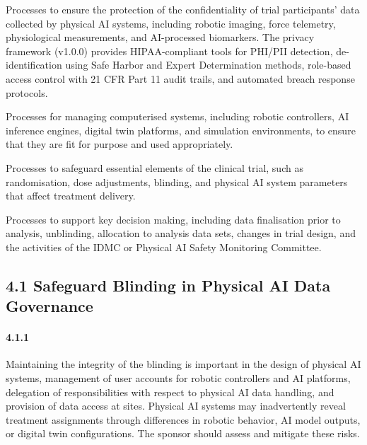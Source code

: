 \begin{description}[leftmargin=2.5cm,style=sameline]

\item[(a)] Processes to ensure the protection of the confidentiality of trial participants' data collected by physical AI systems, including robotic imaging, force telemetry, physiological measurements, and AI-processed biomarkers. The privacy framework (v1.0.0) provides HIPAA-compliant tools for PHI/PII detection, de-identification using Safe Harbor and Expert Determination methods, role-based access control with 21 CFR Part 11 audit trails, and automated breach response protocols.

\item[(b)] Processes for managing computerised systems, including robotic controllers, AI inference engines, digital twin platforms, and simulation environments, to ensure that they are fit for purpose and used appropriately.

\item[(c)] Processes to safeguard essential elements of the clinical trial, such as randomisation, dose adjustments, blinding, and physical AI system parameters that affect treatment delivery.

\item[(d)] Processes to support key decision making, including data finalisation prior to analysis, unblinding, allocation to analysis data sets, changes in trial design, and the activities of the IDMC or Physical AI Safety Monitoring Committee.

\end{description}

\subsection{4.1 Safeguard Blinding in Physical AI Data Governance}

\paragraph{4.1.1} Maintaining the integrity of the blinding is important in the design of physical AI systems, management of user accounts for robotic controllers and AI platforms, delegation of responsibilities with respect to physical AI data handling, and provision of data access at sites. Physical AI systems may inadvertently reveal treatment assignments through differences in robotic behavior, AI model outputs, or digital twin configurations. The sponsor should assess and mitigate these risks.

